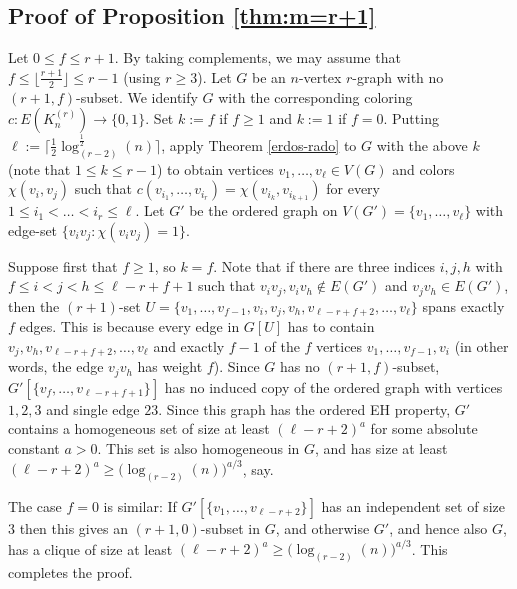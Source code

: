 \documentclass[11pt]{article}
\let\oldendproof\endproof
\renewenvironment{proof}[1][\proofname]{%
	\oldproof[\bf #1]%
}{\oldendproof}
\theoremstyle{plain}
\begin{document}
\subsection{Proof of Proposition \ref{thm:m=r+1}}\label{subsec:r+1}
\begin{proof}[Proof of Proposition \ref{thm:m=r+1}]
Let $0 \leq f \leq r+1$. 
By taking complements, we may assume that $f \leq \lfloor \frac{r+1}{2} \rfloor \leq r-1$ (using $r \geq 3$). 
Let $G$ be an $n$-vertex $r$-graph with no $(r+1,f)$-subset. 
We identify $G$ with the corresponding coloring $c:E(K_n^{(r)}) \to \{0,1\}$. 
Set $k := f$ if $f \geq 1$ and $k := 1$ if $f=0$.
Putting $\ell := \big\lceil \frac{1}{2} \log^{\frac{1}{2}}_{(r-2)}(n) \big\rceil$, apply Theorem \ref{erdos-rado} to $G$ with the above $k$ (note that $1 \leq k \leq r-1$) to obtain vertices $v_1,\dots,v_{\ell} \in V(G)$ and colors $\chi(v_i,v_j)$ such that $c(v_{i_1},\dots,v_{i_r}) = \chi(v_{i_{k}},v_{i_{k+1}})$ for every $1 \leq i_1 < \dots < i_r \leq \ell$. 
Let $G'$ be the ordered graph on $V(G') = \{v_1,\dots,v_{\ell}\}$ with edge-set $\{v_iv_j : \chi(v_iv_j) = 1\}$.

Suppose first that $f \geq 1$, so $k = f$. Note that if there are three indices $i,j,h$ with $f \leq i < j < h \leq \ell-r+f+1$ such that $v_iv_j,v_iv_h \notin E(G')$ and $v_jv_h \in E(G')$, then the $(r+1)$-set 
$U = \{v_1,\dots,v_{f-1},v_i,v_j,v_h,v_{\ell-r+f+2},\dots,v_{\ell}\}$ spans exactly $f$ edges. This is because every edge in $G[U]$ has to contain $v_j,v_h,v_{\ell-r+f+2},\dots,v_{\ell}$ and exactly $f-1$ of the $f$ vertices $v_1,\dots,v_{f-1},v_i$ (in other words, the edge $v_jv_h$ has weight $f$). Since $G$ has no $(r+1,f)$-subset, 
$G'[\{v_f,\dots,v_{\ell-r+f+1}\}]$ has no induced copy of the ordered graph with vertices $1,2,3$ and single edge $23$. Since this graph has the ordered EH property, $G'$ contains a homogeneous set of size at least $(\ell-r+2)^{a}$ for some absolute constant 
$a > 0$. This set is also homogeneous in $G$, and has size at least 
$(\ell-r+2)^a \geq 
\big(\log_{(r-2)}(n) \big)^{a/3}$, say. 

The case $f = 0$ is similar: If 
$G'[\{v_1,\dots,v_{\ell-r+2}\}]$ has an independent set of size $3$ then this gives an $(r+1,0)$-subset in $G$, and otherwise 
$G'$, and hence also $G$, has a clique of size at least 
$(\ell-r+2)^a \geq 
\big(\log_{(r-2)}(n) \big)^{a/3}$.
This completes the proof. 
\end{proof}
\end{document}
